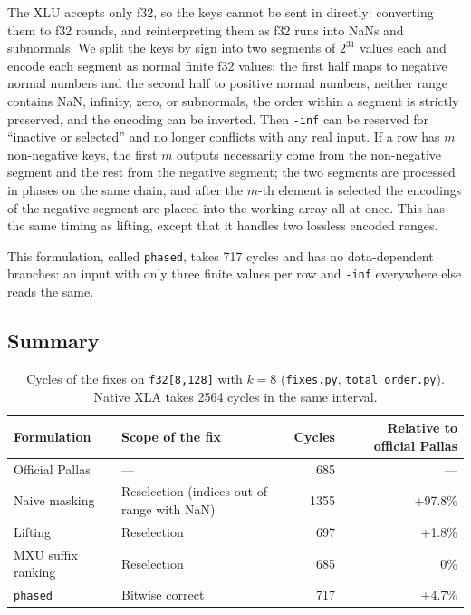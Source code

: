 \documentclass[sigconf,nonacm,balance=false]{acmart}
\newcommand{\code}[1]{\texttt{#1}}
\begin{document}
The XLU accepts only f32, so the keys cannot be sent in directly: converting them to f32 rounds, and reinterpreting them as f32 runs into NaNs and subnormals. We split the keys by sign into two segments of $2^{31}$ values each and encode each segment as normal finite f32 values: the first half maps to negative normal numbers and the second half to positive normal numbers, neither range contains NaN, infinity, zero, or subnormals, the order within a segment is strictly preserved, and the encoding can be inverted. Then \code{-inf} can be reserved for ``inactive or selected'' and no longer conflicts with any real input. If a row has $m$ non-negative keys, the first $m$ outputs necessarily come from the non-negative segment and the rest from the negative segment; the two segments are processed in phases on the same chain, and after the $m$-th element is selected the encodings of the negative segment are placed into the working array all at once. This has the same timing as lifting, except that it handles two lossless encoded ranges.

This formulation, called \code{phased}, takes 717 cycles and has no data-dependent branches: an input with only three finite values per row and \code{-inf} everywhere else reads the same.

\subsection{Summary}
\label{sec:4.10}

\begin{table}
\centering
\caption{Cycles of the fixes on \code{f32[8,\allowbreak{}128]} with $k = 8$ (\code{fixes.\allowbreak{}py}, \code{total\_\allowbreak{}order.\allowbreak{}py}). Native XLA takes 2564 cycles in the same interval.}
\label{tab:5}
\begin{tabular}{llrr}
\toprule
Formulation & Scope of the fix & Cycles & Relative to official Pallas \\
\midrule
Official Pallas & --- & 685 & --- \\
Naive masking & Reselection (indices out of range with NaN) & 1355 & +97.8\% \\
Lifting & Reselection & 697 & +1.8\% \\
MXU suffix ranking & Reselection & 685 & 0\% \\
\code{phased} & Bitwise correct & 717 & +4.7\% \\
\bottomrule
\end{tabular}
\end{table}
\end{document}
